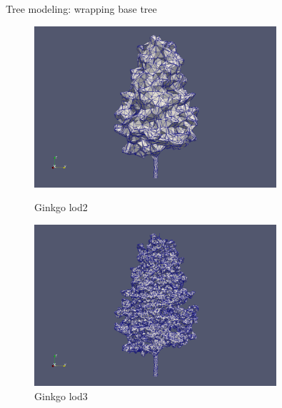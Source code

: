 \documentclass[10pt]{beamer}
\begin{document}
\begin{frame}{Tree modeling: wrapping base tree}
\begin{figure}[H]
    \centering
    \begin{minipage}{0.49\textwidth}
        \centering
        \includegraphics[width=0.8\textwidth]{images/gingko_lod2.png}
        \caption{Ginkgo lod2}
    \end{minipage}\hfill
    \begin{minipage}{0.49\textwidth}
        \centering
        \includegraphics[width=0.8\textwidth]{images/gingko_lod3.png}
        \caption{Ginkgo lod3}
    \end{minipage}
\end{figure}
\end{frame}
\end{document}
